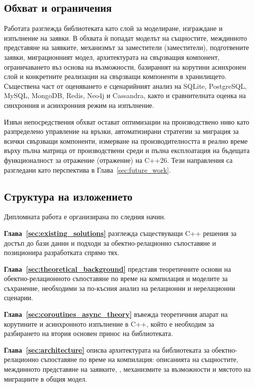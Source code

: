 \subsection{Обхват и ограничения}

Работата разглежда библиотеката като слой за моделиране, изграждане и изпълнение на заявки. В обхвата ѝ попадат моделът на същностите, междинното представяне на заявките, механизмът за заместители (заместители), подготвените заявки, миграционният модел, архитектурата на свързващия компонент, ограничаването въз основа на възможности, базираният на корутини асинхронен слой и конкретните реализации на свързващи компоненти в хранилището. Съществена част от оценяването е сценарийният анализ на SQLite, PostgreSQL, MySQL, MongoDB, Redis, Neo4j и Cassandra, както и сравнителната оценка на синхронния и асинхронния режим на изпълнение.

Извън непосредствения обхват остават оптимизации на производствено ниво като разпределено управление на връзки, автоматизирани стратегии за миграция за всички свързващи компоненти, измерване на производителността в реално време върху пълна матрица от производствени среди и пълна експлоатация на бъдещата функционалност за отражение (отражение) на C++26. Тези направления са разгледани като перспектива в Глава~\ref{sec:future_work}.

\subsection{Структура на изложението}

Дипломната работа е организирана по следния начин.

\textbf{Глава~\ref{sec:existing_solutions}} разглежда съществуващи C++ решения за достъп до бази данни и подходи за обектно-релационно съпоставяне и позиционира разработката спрямо тях.

\textbf{Глава~\ref{sec:theoretical_background}} представя теоретичните основи на обектно-релационното съпоставяне по време на компилация и моделите за съхранение, необходими за по-късния анализ на релационни и нерелационни сценарии.

\textbf{Глава~\ref{sec:coroutines_async_theory}} въвежда теоретичния апарат на корутините и асинхронното изпълнение в C++, който е необходим за разбирането на втория основен принос на библиотеката.

\textbf{Глава~\ref{sec:architecture}} описва архитектурата на библиотеката за обектно-релационно съпоставяне по време на компилация: описанията на същностите, междинното представяне на заявките, , механизмите за възможности и мястото на миграциите в общия модел.

